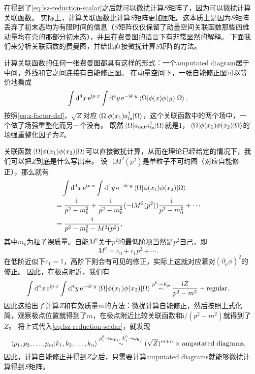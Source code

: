 \documentclass[hyperref, UTF8, a4paper]{ctexart}
\newcommand*{\ii}{\mathrm{i}}
\newcommand*{\ee}{\mathrm{e}}
\begin{document}
在得到了\eqref{eq:lsz-reduction-scalar}之后就可以微扰计算$S$矩阵了，因为可以微扰计算关联函数。
实际上，计算关联函数比计算$S$矩阵更加困难。这本质上是因为$S$矩阵丢弃了初末态均为有限时间的信息（$S$矩阵仅仅保留了动量空间关联函数那些四维动量均在壳的那部分初末态），并且在费曼图的语言下有非常显然的解释。
下面我们来分析关联函数的费曼图，并给出直接微扰计算$S$矩阵的方法。

计算关联函数的任何一张费曼图都具有这样的形式：一个amputated diagram居于中间，外线和它之间连接有自能修正图。
在动量空间下，一张自能修正图可以等价地看成
\[
    \int \dd[4]{x} \ee^{\ii p \cdot x} \int \dd[4]{y} \ee^{- \ii k \cdot y} \mel{\Omega}{\phi(x) \phi(y)}{\Omega},
\]
按照\eqref{eq:z-factor-def}，$\sqrt{Z}$对应$\mel{\Omega}{\phi(x_1) a^\dagger_\text{in}}{\Omega}$，这个关联函数中的两个场中，一个做了场强重整化而另一个没有。
既然$\mel{\Omega}{a_\text{out} a^\dagger_\text{in}}{\Omega}$就是$1$，$\mel{\Omega}{\phi(x_1) \phi(x_2)}{\Omega}$的场强重整化因子为$Z$。

关联函数$\mel{\Omega}{\phi(x_1) \phi(x_2)}{\Omega}$可以直接微扰计算，从而在理论已经给定的情况下，我们可以把$Z$到底是什么写出来。
设$- \ii M^2(p^2)$是单粒子不可约图（对应自能修正），那么就有
\[
    \begin{aligned}
        &\quad \int \dd[4]{x} \ee^{\ii p \cdot x} \int \dd[4]{y} \ee^{- \ii k \cdot y} \mel{\Omega}{\phi(x_1) \phi(x_2)}{\Omega} \\
        &= \frac{\ii}{p^2 - m_0^2} + \frac{\ii}{p^2 - m_0^2} (- \ii M^2(p^2)) \frac{\ii}{p^2 - m_0^2} + \cdots \\
        &= \frac{\ii}{p^2 - m_0^2 - M^2(p^2)},
    \end{aligned}
\]
其中$m_0$为粒子裸质量。自能$M^2$关于$p^2$的最低阶项当然是$p^2$自己，即
\[
    M^2 = c_0 + c_1 p^2 + \cdots.
\]
在低阶近似下$c_1=1$，高阶下则会有可见的修正，实际上这就对应着对$(\partial_\mu \phi)^2$的修正。
因此，在极点附近，我们有
\begin{equation}
    \int \dd[4]{x} \ee^{\ii p \cdot x} \int \dd[4]{y} \ee^{- \ii k \cdot y} \mel{\Omega}{\phi(x_1) \phi(x_2)}{\Omega} \stackrel{p^0 \to E_{\vb*{p}}}{\sim} \frac{\ii Z}{p^2 - m^2} + \text{regular}. 
\end{equation}
因此这给出了计算$Z$和有效质量$m$的方法：微扰计算自能修正，然后按照上式化简，观察极点位置就得到了$m$，在极点附近比较关联函数和$\ii / (p^2 - m^2)$就得到了$Z$。
将上式代入\eqref{eq:lsz-reduction-scalar}，就发现
\begin{equation}
    \braket*{p_1, p_2, \ldots, p_m}{k_1, k_2, \ldots, k_n} \stackrel{p_i^0 \to \omega_{\vb*{p}_i}, \; k_j^0 \to \omega_{\vb*{k}_j}}{\sim} (\sqrt{Z})^{m+n} \times \text{amputated diagrams}.
    \label{eq:amputated-diagram-z-factor}
\end{equation}
因此，计算自能修正并得到$Z$之后，只需要计算amputated diagrams就能够微扰计算得到$S$矩阵。
\end{document}
